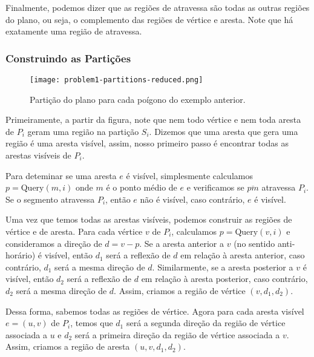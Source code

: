 \documentclass{article}
\begin{document}
Finalmente, podemos dizer que as regiões de atravessa são todas as outras regiões do plano, ou seja, o complemento das regiões de vértice e aresta. Note que há exatamente uma região de atravessa.

\subsubsection{Construindo as Partições}

\begin{wrapfigure}{r}{0.60\textwidth}

\vspace{-15pt}
\centering
\texttt{[image: problem1-partitions-reduced.png]}
\caption{Partição do plano para cada poígono do exemplo anterior.}

\end{wrapfigure}

Primeiramente, a partir da figura, note que nem todo vértice e nem toda aresta de \(P_i\) geram uma região na partição \(S_i\). Dizemos que uma aresta que gera uma região é uma aresta visível, assim, nosso primeiro passo é encontrar todas as arestas visíveis de \(P_i\). 

Para deteminar se uma aresta \(e\) é visível, simplesmente calculamos \(p = \text{Query}(m, i)\) onde \(m\) é o ponto médio de \(e\) e verificamos se \(\overline{pm}\) atravessa \(P_i\). Se o segmento atravessa \(P_i\), então \(e\) não é visível, caso contrário, \(e\) é visível.

Uma vez que temos todas as arestas visíveis, podemos construir as regiões de vértice e de aresta. Para cada vértice \(v\) de \(P_i\), calculamos \(p = \text{Query}(v, i)\) e consideramos a direção de \(d = v - p\).
Se a aresta anterior a \(v\) (no sentido anti-horário) é visível, então \(d_1\) será a reflexão de \(d\) em relação à aresta anterior, caso contrário, \(d_1\) será a mesma direção de \(d\). Similarmente, se a aresta posterior a \(v\) é visível, então \(d_2\) será a reflexão de \(d\) em relação à aresta posterior, caso contrário, \(d_2\) será a mesma direção de \(d\). Assim, criamos a região de vértice \((v, d_1, d_2)\).

Dessa forma, sabemos todas as regiões de vértice. Agora para cada aresta visível \(e = (u, v)\) de \(P_i\), temos que \(d_1\) será a segunda direção da região de vértice associada a \(u\) e \(d_2\) será a primeira direção da região de vértice associada a \(v\). Assim, criamos a região de aresta \((u, v, d_1, d_2)\).
\end{document}
